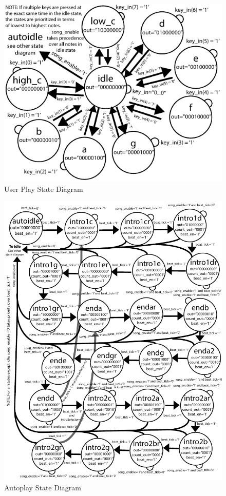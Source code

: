 \documentclass{article}
\begin{document}
	    
	      \begin{figure}[H]
	        \centering
	        \includegraphics[width=6in]{img/UserStateDiagram}
	        \caption{User Play State Diagram}
	      \end{figure}
	      \newpage
	      \begin{figure}[H]
	        \centering
	        \includegraphics[width=6.5in]{img/AutoplayStateDiagram}
	        \caption{Autoplay State Diagram}
	      \end{figure}
\end{document}
